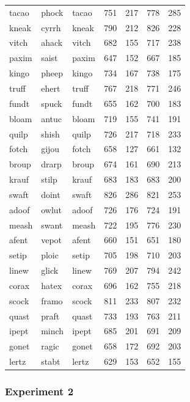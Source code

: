 \documentclass[
]{interact}
\begin{document}
\begin{longtable*}{lllrrrr}
tacao & phock & tacao & 751 & 217 & 778 & 285 \\ 
kneak & cyrrh & kneak & 790 & 212 & 826 & 228 \\ 
vitch & ahack & vitch & 682 & 155 & 717 & 238 \\ 
paxim & saist & paxim & 647 & 152 & 667 & 185 \\ 
kingo & pheep & kingo & 734 & 167 & 738 & 175 \\ 
truff & ehert & truff & 767 & 218 & 771 & 246 \\ 
fundt & spuck & fundt & 655 & 162 & 700 & 183 \\ 
bloam & antuc & bloam & 719 & 155 & 741 & 191 \\ 
quilp & shish & quilp & 726 & 217 & 718 & 233 \\ 
fotch & gijou & fotch & 658 & 127 & 661 & 132 \\ 
broup & drarp & broup & 674 & 161 & 690 & 213 \\ 
krauf & stilp & krauf & 683 & 183 & 683 & 200 \\ 
swaft & doint & swaft & 826 & 286 & 821 & 253 \\ 
adoof & owlut & adoof & 726 & 176 & 724 & 191 \\ 
meash & swant & meash & 722 & 195 & 776 & 230 \\ 
afent & vepot & afent & 660 & 151 & 651 & 180 \\ 
setip & ploic & setip & 705 & 198 & 710 & 203 \\ 
linew & glick & linew & 769 & 207 & 794 & 242 \\ 
corax & hatex & corax & 696 & 162 & 755 & 218 \\ 
scock & framo & scock & 811 & 233 & 807 & 232 \\ 
quast & praft & quast & 733 & 193 & 763 & 211 \\ 
ipept & minch & ipept & 685 & 201 & 691 & 209 \\ 
gonet & ragic & gonet & 658 & 172 & 692 & 203 \\ 
lertz & stabt & lertz & 629 & 153 & 652 & 155 \\ 
\bottomrule
\end{longtable*}

\subsubsection*{Experiment 2}\label{experiment-2-1}
\end{document}
